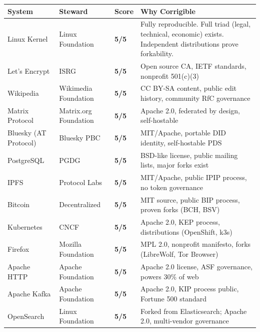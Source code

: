 \documentclass{article}
\begin{document}
\begin{table}[htbp]
\centering
\small
\renewcommand{\arraystretch}{1.3}
\begin{tabular}{@{}l>{\raggedright}p{3.2cm}>{\centering\arraybackslash}p{1.2cm}p{5.8cm}@{}}
\toprule
\rowcolor{gray!15}
\textbf{System} & \textbf{Steward} & \textbf{Score} & \textbf{Why Corrigible} \\
\midrule
\rowcolor{green!8}
Linux Kernel & Linux Foundation & \cellcolor{green!25}\textbf{5/5} & Fully reproducible. Full triad (legal, technical, economic) exists. Independent distributions prove forkability. \\
Let's Encrypt & ISRG & \cellcolor{green!25}\textbf{5/5} & Open source CA, IETF standards, nonprofit 501(c)(3) \\
\rowcolor{green!8}
Wikipedia & Wikimedia Foundation & \cellcolor{green!25}\textbf{5/5} & CC BY-SA content, public edit history, community RfC governance \\
Matrix Protocol & Matrix.org Foundation & \cellcolor{green!25}\textbf{5/5} & Apache 2.0, federated by design, self-hostable \\
\rowcolor{green!8}
Bluesky (AT Protocol) & Bluesky PBC & \cellcolor{green!25}\textbf{5/5} & MIT/Apache, portable DID identity, self-hostable PDS \\
PostgreSQL & PGDG & \cellcolor{green!25}\textbf{5/5} & BSD-like license, public mailing lists, major forks exist \\
\rowcolor{green!8}
IPFS & Protocol Labs & \cellcolor{green!25}\textbf{5/5} & MIT/Apache, public IPIP process, no token governance \\
Bitcoin & Decentralized & \cellcolor{green!25}\textbf{5/5} & MIT source, public BIP process, proven forks (BCH, BSV) \\
\rowcolor{green!8}
Kubernetes & CNCF & \cellcolor{green!25}\textbf{5/5} & Apache 2.0, KEP process, distributions (OpenShift, k3s) \\
Firefox & Mozilla Foundation & \cellcolor{green!25}\textbf{5/5} & MPL 2.0, nonprofit manifesto, forks (LibreWolf, Tor Browser) \\
\rowcolor{green!8}
Apache HTTP & Apache Foundation & \cellcolor{green!25}\textbf{5/5} & Apache 2.0 license, ASF governance, powers 30\% of web \\
Apache Kafka & Apache Foundation & \cellcolor{green!25}\textbf{5/5} & Apache 2.0, KIP process public, Fortune 500 standard \\
\rowcolor{green!8}
OpenSearch & Linux Foundation & \cellcolor{green!25}\textbf{5/5} & Forked from Elasticsearch; Apache 2.0, multi-vendor governance \\

\end{tabular}
\end{table}
\end{document}
